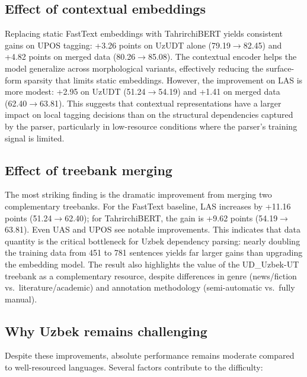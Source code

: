 \documentclass[runningheads]{llncs}
\begin{document}
\subsection{Effect of contextual embeddings}
\label{subsec:disc_bert}
Replacing static FastText embeddings with TahrirchiBERT yields consistent gains on UPOS tagging: +3.26 points on UzUDT alone (79.19$\to$82.45) and +4.82 points on merged data (80.26$\to$85.08). The contextual encoder helps the model generalize across morphological variants, effectively reducing the surface-form sparsity that limits static embeddings. However, the improvement on LAS is more modest: +2.95 on UzUDT (51.24$\to$54.19) and +1.41 on merged data (62.40$\to$63.81). This suggests that contextual representations have a larger impact on local tagging decisions than on the structural dependencies captured by the parser, particularly in low-resource conditions where the parser's training signal is limited.

\subsection{Effect of treebank merging}
\label{subsec:disc_data}
The most striking finding is the dramatic improvement from merging two complementary treebanks. For the FastText baseline, LAS increases by +11.16 points (51.24$\to$62.40); for TahrirchiBERT, the gain is +9.62 points (54.19$\to$63.81). Even UAS and UPOS see notable improvements. This indicates that data quantity is the critical bottleneck for Uzbek dependency parsing: nearly doubling the training data from 451 to 781 sentences yields far larger gains than upgrading the embedding model. The result also highlights the value of the UD\_Uzbek-UT treebank as a complementary resource, despite differences in genre (news/fiction vs.\ literature/academic) and annotation methodology (semi-automatic vs.\ fully manual).

\subsection{Why Uzbek remains challenging}
\label{subsec:disc_challenges}
Despite these improvements, absolute performance remains moderate compared to well-resourced languages. Several factors contribute to the difficulty:
\end{document}
